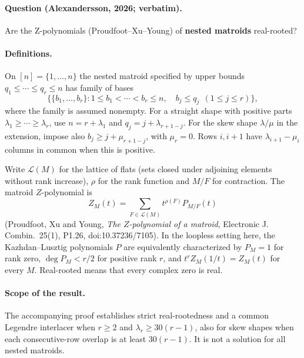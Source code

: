 \documentclass{article}
\begin{document}
\paragraph{Question (Alexandersson, 2026; verbatim).}
Are the Z-polynomials (Proudfoot--Xu--Young) of \textbf{nested matroids} real-rooted?

\paragraph{Definitions.}
On $[n]=\{1,\ldots,n\}$ the nested matroid specified by upper bounds
$q_1\le\cdots\le q_r\le n$ has family of bases
\[
 \bigl\{\{b_1,\ldots,b_r\}:1\le b_1<\cdots<b_r\le n,\quad
 b_j\le q_j\ \ (1\le j\le r)\bigr\},
\]
where the family is assumed nonempty. For a straight shape with positive
parts $\lambda_1\ge\cdots\ge\lambda_r$, use
$n=r+\lambda_1$ and $q_j=j+\lambda_{r+1-j}$.
For the skew shape $\lambda/\mu$ in the extension, impose also
$b_j\ge j+\mu_{r+1-j}$, with $\mu_r=0$.
Rows $i,i+1$ have $\lambda_{i+1}-\mu_i$ columns in common when this is
positive.

Write $\mathcal L(M)$ for the lattice of flats (sets closed under adjoining
elements without rank increase), $\rho$ for the rank function and $M/F$
for contraction. The matroid $Z$-polynomial is
\[
 Z_M(t)=\sum_{F\in\mathcal L(M)}t^{\rho(F)}P_{M/F}(t)
\]
(Proudfoot, Xu and Young, \emph{The $Z$-polynomial of a matroid},
Electronic J. Combin.\ 25(1), P1.26, doi:10.37236/7105).
In the loopless setting here, the Kazhdan--Lusztig polynomials $P$ are
equivalently characterized by $P_M=1$ for rank zero, $\deg P_M<r/2$
for positive rank $r$, and $t^r Z_M(1/t)=Z_M(t)$ for every $M$.
Real-rooted means that every complex zero is real.

\paragraph{Scope of the result.}
The accompanying proof establishes strict real-rootedness and a common
Legendre interlacer when $r\ge2$ and $\lambda_r\ge30(r-1)$, also for
skew shapes when each consecutive-row overlap is at least $30(r-1)$.
It is not a solution for all nested matroids.
\end{document}
